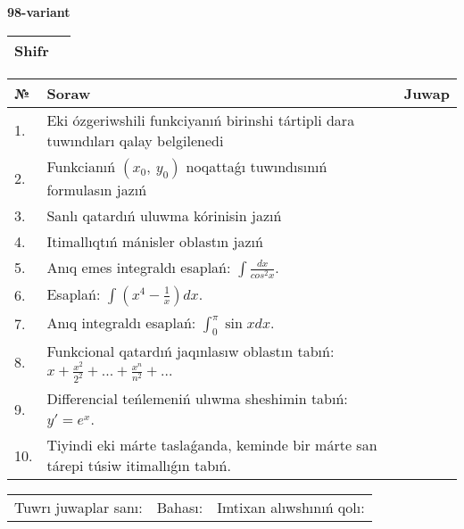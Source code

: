 \documentclass{article}
\begin{document}
  \egroup
  
  \newpage
  
  
  \textbf{98-variant}\\
  
  \bgroup
  \def\arraystretch{1.6} %
  
  \begin{tabular}{|m{5.7cm}|m{9.5cm}|}
  \hline
  Shifr & \\
  \hline
  \end{tabular}
  
  \vspace{1cm}
  
  \begin{tabular}{|m{0.7cm}|m{10cm}|m{4cm}|}
  \hline
  № & Soraw & Juwap \\
  \hline
  1. & Eki ózgeriwshili funkciyanıń birinshi tártipli dara tuwındıları qalay belgilenedi &  \\
  \hline
  2. & Funkcianıń \((x_{0},\ y_{0})\) noqattaǵı tuwındısınıń formulasın jazıń &  \\
  \hline
  3. & Sanlı qatardıń uluwma kórinisin jazıń &  \\
  \hline
  4. & Itimallıqtıń mánisler oblastın jazıń &  \\
  \hline
  5. & Anıq emes integraldı esaplań: \(\int\frac{dx}{cos^2 x}\). &  \\
  \hline
  6. & Esaplań: \(\int\left( x^{4} - \frac{1}{x} \right)dx\). &  \\
  \hline
  7. & Anıq integraldı esaplań: \(\int_{0}^{\pi}{\sin xdx}\). &  \\
  \hline
  8. & Funkcional qatardıń jaqınlasıw oblastın tabıń: \(x + \frac{x^2 }{2^2 } + ... + \frac{x^{n}}{n^2 } + ...\) &  \\
  \hline
  9. & Differencial teńlemeniń ulıwma sheshimin tabıń: \(y' = e^{x}\). &  \\
  \hline
  10. & Tiyindi eki márte taslaǵanda, keminde bir márte san tárepi túsiw itimallıǵın tabıń. &  \\
  \hline
  \end{tabular}
  
  \vspace{1cm}
  
  \begin{tabular}{lll}
  Tuwrı juwaplar sanı: \underline{\hspace{1.5cm}} & 
  Bahası: \underline{\hspace{1.5cm}} & 
  Imtixan alıwshınıń qolı: \underline{\hspace{2cm}} \\
  \end{tabular}
  
\end{document}
